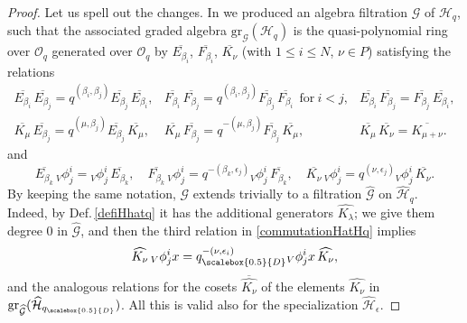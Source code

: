 \documentclass[11pt]{amsart}
\newcommand{\e}{\epsilon}
\newcommand{\Gg}{\mathcal{G}}
\newcommand{\Hh}{\mathcal{H}}
\newcommand{\qD}{q_{\scalebox{0.5}{D}}}
\begin{document}
\begin{proof}
Let us spell out the changes. In \cite[Prop.\,5.7]{BFR} we produced an algebra filtration $\Gg$ of $\mathcal{H}_q$, such that the associated graded algebra $\mathrm{gr}_{\Gg}(\mathcal{H}_q)$ is the quasi-polynomial ring over $\mathcal{O}_q$ generated over $\mathcal{O}_q$ by $\overline{E_{\beta_i}}$, $\overline{F_{\beta_i}}$, $\overline{K_{\nu}}$ (with $1 \leq i \leq N$, $\nu \in P$) satisfying the relations 
\begin{equation}\label{commutationGrDCK}
\begin{array}{lll}
\overline{E_{\beta_i}} \, \overline{E_{\beta_j}} = q^{(\beta_i,\beta_j)} \overline{E_{\beta_j}} \, \overline{E_{\beta_i}}, & \overline{F_{\beta_i}} \, \overline{F_{\beta_j}} = q^{(\beta_i,\beta_j)} \overline{F_{\beta_j}} \, \overline{F_{\beta_i}} \ \  \mathrm{for}\ i<j, & \overline{E_{\beta_i}} \, \overline{F_{\beta_j}} = \overline{F_{\beta_j}} \, \overline{E_{\beta_i}},\\[.5em]
\overline{K_{\mu}} \, \overline{E_{\beta_j}} = q^{(\mu,\beta_j)} \overline{E_{\beta_j}} \, \overline{K_{\mu}}, & \overline{K_{\mu}} \, \overline{F_{\beta_j}} = q^{-(\mu,\beta_j)} \overline{F_{\beta_j}} \, \overline{K_{\mu}}, & \overline{K_{\mu}} \, \overline{K_{\nu}} = \overline{K_{\mu + \nu}}.
\end{array}
\end{equation}
 and 
\begin{equation}\label{commutationGrDCK2}
\overline{E_{\beta_k}} \, {_V\phi^i_j} = {_V\phi^i_j} \, \overline{E_{\beta_k}}, \quad \overline{F_{\beta_k}} \, {_V\phi^i_j} = q^{-(\beta_k, \epsilon_j)} {_V\phi^i_j} \, \overline{F_{\beta_k}}, \quad \overline{K_{\nu}} \, {_V\phi^i_j} = q^{(\nu, \epsilon_j)} {_V\phi^i_j} \, \overline{K_{\nu}}. 
\end{equation}
By keeping the same notation, $\Gg$ extends trivially to a filtration $\widehat{\Gg}$ on $\textstyle \widehat{\mathcal{H}}_{q}$. Indeed, by Def.\,\ref{defiHhatq} it has the additional generators $\widehat{K_\lambda}$; we give them degree $0$ in $\widehat{\Gg}$, and then the third relation in \eqref{commutationHatHq} implies 
\begin{equation}\label{relhatsept25}
\widehat{K_{\nu}} \, {_V\phi^i_j}x = \qD^{-(\nu, \epsilon_i)} {_V\phi^i_j}x \, \widehat{K_{\nu}},
\end{equation}
and the analogous relations for the cosets $ \overline{\widehat{K_{\nu}}}$ of the elements $\widehat{K_{\nu}}$ in $\mathrm{gr}_{\widehat{\Gg}}( \widehat{\mathcal{H}}_{\qD})$. All this is valid also for the specialization $\widehat{\Hh}_{\e}$. 


\end{proof}
\end{document}
